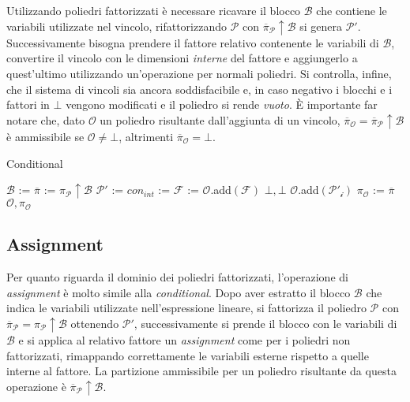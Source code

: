 \documentclass{mimosis}
\theoremstyle{definition}
\begin{document}
Utilizzando poliedri fattorizzati è necessare ricavare il blocco \(\mathcal{B}\) che contiene le
variabili utilizzate nel vincolo, rifattorizzando \(\mathcal{P}\) con
\(\overline{\pi}_{\mathcal{P}} \uparrow \mathcal{B}\) si genera \(\mathcal{P}'\).
Successivamente bisogna prendere il fattore relativo contenente le variabili di
\(\mathcal{B}\), convertire il vincolo con le dimensioni \emph{interne} del fattore e
aggiungerlo a quest'ultimo utilizzando un'operazione per normali poliedri. Si
controlla, infine, che il sistema di vincoli sia ancora soddisfacibile e, in
caso negativo i blocchi e i fattori in \(\bot\) vengono modificati e il poliedro
si rende \emph{vuoto}. È importante far notare che, dato \(\mathcal{O}\) un poliedro
risultante dall'aggiunta di un vincolo, \(\overline{\pi}_{\mathcal{O}} = \overline{\pi}_{\mathcal{P}}
\uparrow \mathcal{B}\) è ammissibile se \(\mathcal{O} \ne \bot\), altrimenti
\(\overline{\pi}_{\mathcal{O}} = \bot\).

\begin{algorithm}[H]
\caption{Conditional}\label{conditional}
\begin{algorithmic}[1]
\State$\mathcal{B}$ := 
\State$\overline{\pi}$ := $\pi_{\mathcal{P}} \uparrow \mathcal{B}$
\State$\mathcal{P}'$ := 
\State$con_{int}$ := 
\State$\mathcal{F}$ := 
\State$\mathcal{O}$.add$(\mathcal{F})$
\State\Return$\bot, \bot$
\EndIf
\State$\mathcal{O}$.add$(\mathcal{P'_i})$
\EndIf
\EndFor
\State$\pi_{\mathcal{O}}$ := $\overline{\pi}$
\State\Return$\mathcal{O}, \pi_{\mathcal{O}}$
\EndFunction
\end{algorithmic}
\end{algorithm}

\subsection{Assignment}
\label{sec:orgb1768fe}
Per quanto riguarda il dominio dei poliedri fattorizzati, l'operazione di
\emph{assignment} è molto simile alla \emph{conditional}. Dopo aver estratto il blocco
\(\mathcal{B}\) che indica le variabili utilizzate nell'espressione lineare, si
fattorizza il poliedro \(\mathcal{P}\) con \(\overline{\pi}_{\mathcal{P}} =
\pi_{\mathcal{P}} \uparrow \mathcal{B}\) ottenendo \(\mathcal{P}'\),
successivamente si prende il blocco con le variabili di \(\mathcal{B}\) e si
applica al relativo fattore un \emph{assignment} come per i poliedri non
fattorizzati, rimappando correttamente le variabili esterne rispetto a quelle
interne al fattore. La partizione ammissibile per un poliedro risultante da
questa operazione è \(\overline{\pi}_{\mathcal{P}} \uparrow \mathcal{B}\).
\end{document}
